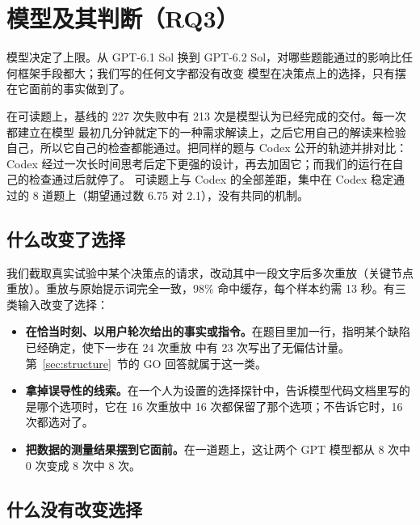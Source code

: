 \section{模型及其判断（RQ3）}
\label{sec:judgment}

模型决定了上限。从 GPT-6.1 Sol 换到 GPT-6.2 Sol，对哪些题能通过的影响比任何框架手段都大；我们写的任何文字都没有改变
模型在决策点上的选择，只有摆在它面前的事实做到了。

在可读题上，基线的 227 次失败中有 213 次是模型认为已经完成的交付。每一次都建立在模型
最初几分钟就定下的一种需求解读上，之后它用自己的解读来检验自己，所以它自己的检查都能通过。把同样的题与 Codex
公开的轨迹并排对比：Codex 经过一次长时间思考后定下更强的设计，再去加固它；而我们的运行在自己的检查通过后就停了。
可读题上与 Codex 的全部差距，集中在 Codex 稳定通过的 8 道题上（期望通过数 6.75 对 2.1），没有共同的机制。

\subsection{什么改变了选择}

我们截取真实试验中某个决策点的请求，改动其中一段文字后多次重放（关键节点重放）。重放与原始提示词完全一致，98\%
命中缓存，每个样本约需 13 秒。有三类输入改变了选择：
\begin{itemize}[leftmargin=1.4em]
  \item \textbf{在恰当时刻、以用户轮次给出的事实或指令。}在题目里加一行，指明某个缺陷已经确定，使下一步在 24 次重放
    中有 23 次写出了无偏估计量。第~\ref{sec:structure}~节的 GO 回答就属于这一类。
  \item \textbf{拿掉误导性的线索。}在一个人为设置的选择探针中，告诉模型代码文档里写的是哪个选项时，它在 16 次重放中
    16 次都保留了那个选项；不告诉它时，16 次都选对了。
  \item \textbf{把数据的测量结果摆到它面前。}在一道题上，这让两个 GPT 模型都从 8 次中 0 次变成 8 次中 8 次。
\end{itemize}

\subsection{什么没有改变选择}

